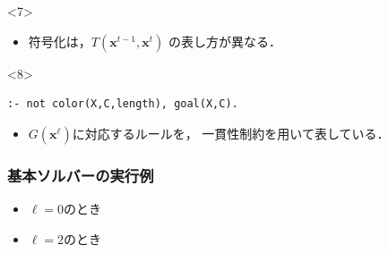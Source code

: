 \documentclass[dvipdfmx,11pt]{beamer}
\begin{document}
\begin{frame}[fragile]
  \begin{onlyenv}<7>
    \begin{itemize}
      \item {}符号化は，$T(\bm{x}^{t-1},\bm{x}^{t})$
            の表し方が異なる．
    \end{itemize}
  \end{onlyenv}

  \begin{onlyenv}<8>
    \begin{exampleblock}{}
      \begin{lstlisting}
:- not color(X,C,length), goal(X,C).
      \end{lstlisting}
    \end{exampleblock}
    \begin{itemize}
      \item $G(\bm{x}^\ell)$に対応するルールを，
            一貫性制約を用いて表している．
    \end{itemize}
  \end{onlyenv}

\end{frame}

\begin{frame}\frametitle{基本ソルバーの実行例}

  \begin{itemize}
    \item $\ell=0$のとき
  \end{itemize}
  \begin{exampleblock}{}
    \centering
    
  \end{exampleblock}
  
  \begin{itemize}
    \item $\ell=2$のとき
  \end{itemize}
  \begin{exampleblock}{}
    \centering
    
  \end{exampleblock}

\end{frame}
\end{document}
